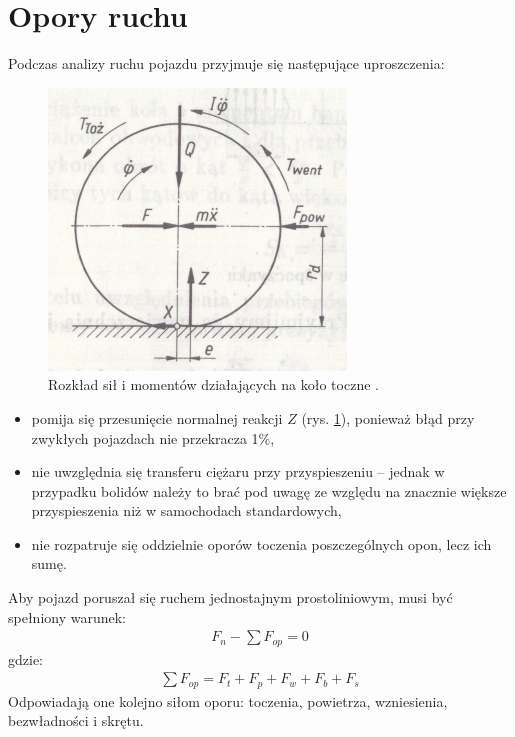 \documentclass{article}
\begin{document}
	\section{Opory ruchu}
	Podczas analizy ruchu pojazdu przyjmuje się następujące uproszczenia:
	\begin{figure}[h!]
		\centering
		\includegraphics{rozklad_kolo_toczone.jpg}
		\caption{Rozkład sił i momentów działających na koło toczne \cite{Arczynski}.}
		\label{fig:rozklad_kolo_toczone}
	\end{figure}
	\begin{itemize}
		\item pomija się przesunięcie normalnej reakcji $Z$ (rys. \ref{fig:rozklad_kolo_toczone}), ponieważ błąd przy zwykłych pojazdach nie przekracza 1\%,
		\item nie uwzględnia się transferu ciężaru przy przyspieszeniu – jednak w przypadku bolidów należy to brać pod uwagę ze względu na znacznie większe przyspieszenia niż w samochodach standardowych,
		\item nie rozpatruje się oddzielnie oporów toczenia poszczególnych opon, lecz ich sumę.
	\end{itemize}
	Aby pojazd poruszał się ruchem jednostajnym prostoliniowym, musi być spełniony warunek:
	\begin{align}
		F_n-\sum F_{op}=0
	\end{align}
	gdzie:
	\begin{align}
		\sum F_{op}=F_t+F_p+F_w+F_b+F_s
	\end{align}
	Odpowiadają one kolejno siłom oporu: toczenia, powietrza, wzniesienia, bezwładności i skrętu.
	
\end{document}
